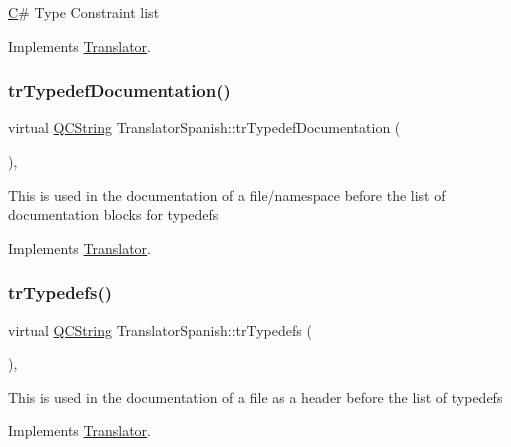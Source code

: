 \mbox{\hyperlink{class_c}{C}}\# Type Constraint list 

Implements \mbox{\hyperlink{class_translator}{Translator}}.

\mbox{\label{class_translator_spanish_a491503c1d30e6c69554e3ac994018988}} 
\subsubsection{\texorpdfstring{trTypedefDocumentation()}{trTypedefDocumentation()}}
{\footnotesize\ttfamily virtual \mbox{\hyperlink{class_q_c_string}{Q\+C\+String}} Translator\+Spanish\+::tr\+Typedef\+Documentation (\begin{DoxyParamCaption}{ }\end{DoxyParamCaption})\hspace{0.3cm}{\ttfamily [inline]}, {\ttfamily [virtual]}}

This is used in the documentation of a file/namespace before the list of documentation blocks for typedefs 

Implements \mbox{\hyperlink{class_translator}{Translator}}.

\mbox{\label{class_translator_spanish_a1782a41e641e7e20ca29bd8de69a2cec}} 
\subsubsection{\texorpdfstring{trTypedefs()}{trTypedefs()}}
{\footnotesize\ttfamily virtual \mbox{\hyperlink{class_q_c_string}{Q\+C\+String}} Translator\+Spanish\+::tr\+Typedefs (\begin{DoxyParamCaption}{ }\end{DoxyParamCaption})\hspace{0.3cm}{\ttfamily [inline]}, {\ttfamily [virtual]}}

This is used in the documentation of a file as a header before the list of typedefs 

Implements \mbox{\hyperlink{class_translator}{Translator}}.

\mbox{\label{class_translator_spanish_a329e258de1c248c87bdc712f395db899}} 
